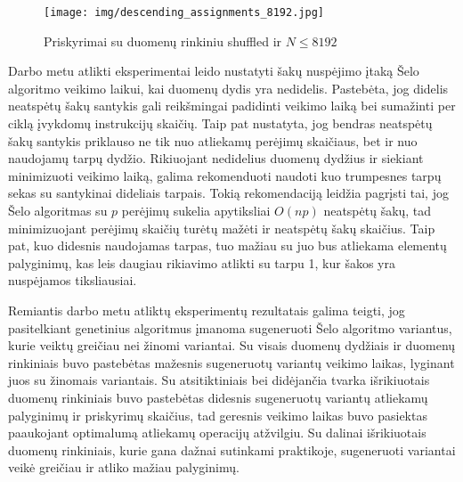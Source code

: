 \documentclass{VUMIFInfBakalaurinis}
\begin{document}
\begin{figure}[H]
  \centering
  \texttt{[image: img/descending\_assignments\_8192.jpg]}
  \caption{Priskyrimai su duomenų rinkiniu shuffled ir $N \leq 8192$}
  \label{img:descending_assignments_8192}
\end{figure}


Darbo metu atlikti eksperimentai leido nustatyti šakų nuspėjimo įtaką Šelo algoritmo veikimo laikui, kai duomenų dydis yra nedidelis.
Pastebėta, jog didelis neatspėtų šakų santykis gali reikšmingai padidinti veikimo laiką bei sumažinti per ciklą įvykdomų instrukcijų skaičių.
Taip pat nustatyta, jog bendras neatspėtų šakų santykis priklauso ne tik nuo atliekamų perėjimų skaičiaus, bet ir nuo naudojamų tarpų dydžio.
Rikiuojant nedidelius duomenų dydžius ir siekiant minimizuoti veikimo laiką, galima rekomenduoti naudoti kuo trumpesnes tarpų sekas
su santykinai dideliais tarpais.
Tokią rekomendaciją leidžia pagrįsti tai, jog Šelo algoritmas su $p$ perėjimų sukelia apytiksliai $O(np)$ neatspėtų šakų,
tad minimizuojant perėjimų skaičių turėtų mažėti ir neatspėtų šakų skaičius.
Taip pat, kuo didesnis naudojamas tarpas, tuo mažiau su juo bus atliekama elementų palyginimų, kas leis daugiau rikiavimo atlikti su tarpu 1,
kur šakos yra nuspėjamos tiksliausiai.

Remiantis darbo metu atliktų eksperimentų rezultatais galima teigti, jog
pasitelkiant genetinius algoritmus įmanoma sugeneruoti Šelo algoritmo variantus, kurie veiktų greičiau nei žinomi variantai.
Su visais duomenų dydžiais ir duomenų rinkiniais buvo pastebėtas mažesnis sugeneruotų variantų veikimo laikas,
lyginant juos su žinomais variantais.
Su atsitiktiniais bei didėjančia tvarka išrikiuotais duomenų rinkiniais buvo pastebėtas didesnis sugeneruotų variantų atliekamų palyginimų ir priskyrimų skaičius,
tad geresnis veikimo laikas buvo pasiektas paaukojant optimalumą atliekamų operacijų atžvilgiu.
Su dalinai išrikiuotais duomenų rinkiniais, kurie gana dažnai sutinkami praktikoje, sugeneruoti variantai veikė greičiau ir atliko mažiau palyginimų.

\end{document}
